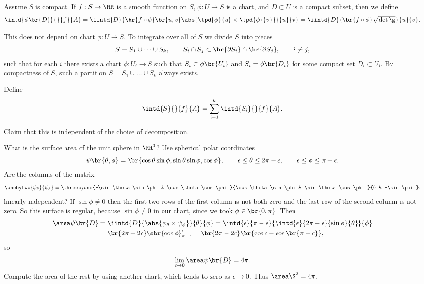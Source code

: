 \begin{definition}
Assume $ S $ is compact. If $ f : S \to \RR $ is a smooth function on $ S $, $ \phi : U \to S $ is a chart, and $ D \subset U $ is a compact subset, then we define
$$ \intd{\phi\br{D}}{}{f}{A} = \iintd{D}{\br{f \circ \phi}\br{u, v}\abs{\tpd{\phi}{u} \times \tpd{\phi}{v}}}{u}{v} = \iintd{D}{\br{f \circ \phi}\sqrt{\det \g}}{u}{v}. $$
\end{definition}

This does not depend on chart $ \phi : U \to S $. To integrate over all of $ S $ we divide $ S $ into pieces
$$ S = S_1 \cup \dots \cup S_k, \qquad S_i \cap S_j \subset \br{\partial S_i} \cap \br{\partial S_j}, \qquad i \ne j, $$
such that for each $ i $ there exists a chart $ \phi : U_i \to S $ such that $ S_i \subset \phi\br{U_i} $ and $ S_i = \phi\br{D_i} $ for some compact set $ D_i \subset U_i $. By compactness of $ S $, such a partition $ S = S_1 \cup \dots \cup S_k $ always exists.

\begin{definition}
Define
$$ \intd{S}{}{f}{A} = \sum_{i = 1}^k \intd{S_i}{}{f}{A}. $$
\end{definition}

Claim that this is independent of the choice of decomposition.


\begin{example*}
What is the surface area of the unit sphere in $ \RR^3 $? Use spherical polar coordinates
$$ \psi\br{\theta, \phi} = \br{\cos \theta\sin \phi, \sin \theta\sin \phi, \cos \phi}, \qquad \epsilon \le \theta \le 2\pi - \epsilon, \qquad \epsilon \le \phi \le \pi - \epsilon. $$
Are the columns of the matrix
$$ \onebytwo{\psi_\theta}{\psi_\phi} = \threebyone{-\sin \theta\sin \phi & \cos \theta\cos \phi}{\cos \theta\sin \phi & \sin \theta\cos \phi}{0 & -\sin \phi}. $$
linearly independent? If $ \sin \phi \ne 0 $ then the first two rows of the first column is not both zero and the last row of the second column is not zero. So this surface is regular, because $ \sin \phi \ne 0 $ in our chart, since we took $ \phi \in \br{0, \pi} $. Then
\begin{align*}
\area \psi\br{D}
& = \iintd{D}{\abs{\psi_\theta \times \psi_\phi}}{\theta}{\phi}
= \intd{\epsilon}{\pi - \epsilon}{\intd{\epsilon}{2\pi - \epsilon}{\sin \phi}{\theta}}{\phi} \\
& = \br{2\pi - 2\epsilon}\sbr{\cos \phi}_{\pi - \epsilon}^\epsilon
= \br{2\pi - 2\epsilon}\br{\cos \epsilon - \cos \br{\pi - \epsilon}},
\end{align*}
so
$$ \lim_{\epsilon \to 0} \area \psi\br{D} = 4\pi. $$
Compute the area of the rest by using another chart, which tends to zero as $ \epsilon \to 0 $. Thus $ \area \S^2 = 4\pi $.
\end{example*}

